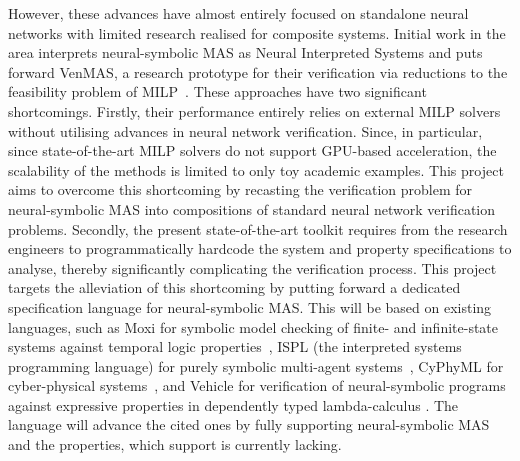 \documentclass[11pt]{article}
\begin{document}
However, these advances have almost entirely focused on
standalone neural networks with limited research realised
for composite systems.  Initial work in the area interprets
neural-symbolic MAS as Neural Interpreted Systems and puts
forward {\sc VenMAS}, a research prototype for their
verification via reductions to the feasibility problem of
MILP~\cite{Akintunde+18,Akintunde+20,Akintunde+22,KouvarosBB24}.
These approaches have two significant shortcomings. Firstly,
their performance entirely relies on external MILP solvers
without utilising advances in neural network verification.
Since, in particular, since state-of-the-art MILP solvers do
not support GPU-based acceleration, the scalability of the
methods is limited to only toy academic examples. This
project aims to overcome this shortcoming by recasting the
verification problem for neural-symbolic MAS into
compositions of standard neural network verification
problems. Secondly, the present state-of-the-art toolkit
requires from the research engineers  to programmatically
hardcode the system and property specifications to analyse,
thereby significantly complicating the verification process.
This project targets the alleviation of this shortcoming by
putting forward a dedicated specification language for
neural-symbolic MAS.  This will be based on existing
languages, such as Moxi for symbolic model checking of
finite- and infinite-state systems against temporal logic
properties~\cite{Rozier+2024}, ISPL (the interpreted systems
programming language) for purely symbolic multi-agent
systems~\cite{LomuscioQR17}, CyPhyML for cyber-physical
systems~\cite{Simko+13}, and Vehicle for verification of
neural-symbolic programs against expressive properties in
dependently typed lambda-calculus \cite{Daggitt+24}. The
language will advance the cited ones by fully supporting
neural-symbolic MAS and the properties, which support is
currently lacking.





\end{document}
